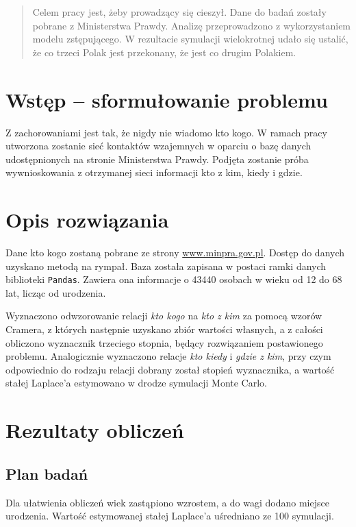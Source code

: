 \documentclass[10pt]{article}
\begin{document}


\begin{abstract}
Celem pracy jest, żeby prowadzący się cieszył. Dane do badań zostały pobrane z Ministerstwa Prawdy. Analizę przeprowadzono z wykorzystaniem modelu zstępującego. W rezultacie symulacji wielokrotnej udało się ustalić, że co trzeci Polak jest przekonany, że jest co drugim Polakiem.  
\end{abstract}

\section{Wstęp -- sformułowanie problemu}
\label{sec:wstep}

Z zachorowaniami jest tak, że nigdy nie wiadomo kto kogo. W ramach pracy utworzona zostanie sieć kontaktów wzajemnych w oparciu o bazę danych udostępnionych na stronie Ministerstwa Prawdy. Podjęta zostanie próba wywnioskowania z otrzymanej sieci informacji kto z kim, kiedy i gdzie.

\section{Opis rozwiązania}

Dane kto kogo zostaną pobrane ze strony \url{www.minpra.gov.pl}. Dostęp do danych uzyskano metodą na rympał. Baza została zapisana w postaci ramki danych biblioteki \texttt{Pandas}. Zawiera ona informacje o 43440 osobach w wieku od 12 do 68 lat, licząc od urodzenia. 

Wyznaczono odwzorowanie relacji \textit{kto kogo} na \textit{kto z kim} za pomocą wzorów Cramera, z których następnie uzyskano zbiór wartości własnych, a z całości obliczono wyznacznik trzeciego stopnia, będący rozwiązaniem postawionego problemu. Analogicznie wyznaczono relacje \textit{kto kiedy} i \textit{gdzie z kim}, przy czym odpowiednio do rodzaju relacji dobrany został stopień wyznacznika, a wartość stałej Laplace'a estymowano w drodze symulacji Monte Carlo.

\section{Rezultaty obliczeń}

\subsection{Plan badań}
Dla ułatwienia obliczeń wiek zastąpiono wzrostem, a do wagi dodano miejsce urodzenia. Wartość estymowanej stałej Laplace'a uśredniano ze 100 symulacji.
\end{document}

